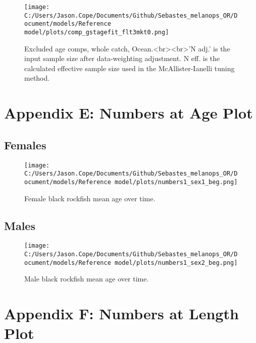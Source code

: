 \documentclass[11pt,
  letterpaper,
]{article}
\begin{document}
\begin{figure}
{\centering
\texttt{[image: C:/Users/Jason.Cope/Documents/Github/Sebastes\_melanops\_OR/Document/models/Reference model/plots/comp\_gstagefit\_flt3mkt0.png]}
}
\caption{Excluded age comps, whole catch, Ocean.<br><br>'N adj.' is the input sample size after data-weighting adjustment. N eff. is the calculated effective sample size used in the McAllister-Ianelli tuning method.\label{fig:comp_gstagefit_flt3mkt0}}
\end{figure}

\clearpage

\hypertarget{app-e}{%
\section{Appendix E: Numbers at Age Plot}\label{app-e}}

\hypertarget{females}{%
\subsection{Females}\label{females}}

\begin{figure}
{\centering
\texttt{[image: C:/Users/Jason.Cope/Documents/Github/Sebastes\_melanops\_OR/Document/models/Reference model/plots/numbers1\_sex1\_beg.png]}
}
\caption{Female black rockfish mean age over time.\label{fig:num_age_females}}
\end{figure}

\hypertarget{males}{%
\subsection{Males}\label{males}}

\begin{figure}
{\centering
\texttt{[image: C:/Users/Jason.Cope/Documents/Github/Sebastes\_melanops\_OR/Document/models/Reference model/plots/numbers1\_sex2\_beg.png]}
}
\caption{Male black rockfish mean age over time.\label{fig:num_age_males}}
\end{figure}

\clearpage

\hypertarget{app-f}{%
\section{Appendix F: Numbers at Length Plot}\label{app-f}}
\end{document}
